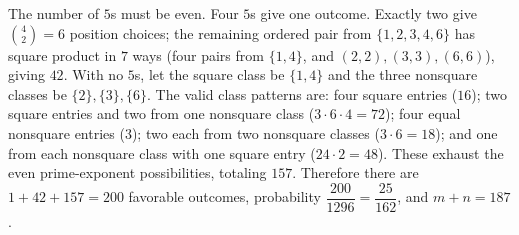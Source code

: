 The number of $5$s must be even. Four $5$s give one outcome. Exactly two give $\binom42=6$ position choices; the remaining ordered pair from $\{1,2,3,4,6\}$ has square product in $7$ ways (four pairs from $\{1,4\}$, and $(2,2),(3,3),(6,6)$), giving $42$. With no $5$s, let the square class be $\{1,4\}$ and the three nonsquare classes be $\{2\},\{3\},\{6\}$. The valid class patterns are: four square entries ($16$); two square entries and two from one nonsquare class ($3\cdot6\cdot4=72$); four equal nonsquare entries ($3$); two each from two nonsquare classes ($3\cdot6=18$); and one from each nonsquare class with one square entry ($24\cdot2=48$). These exhaust the even prime-exponent possibilities, totaling $157$. Therefore there are $1+42+157=200$ favorable outcomes, probability $\dfrac{200}{1296}=\dfrac{25}{162}$, and $\boxed{m+n=187}$.

